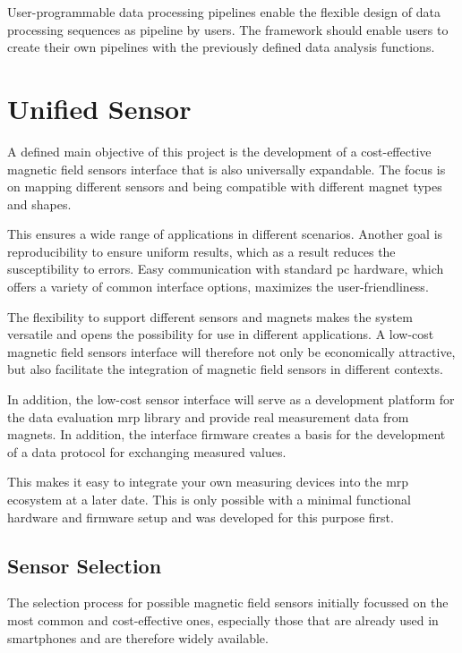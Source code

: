 User-programmable data processing pipelines enable the flexible design
of data processing sequences as pipeline by users. The framework should
enable users to create their own pipelines with the previously defined
data analysis functions.

\hypertarget{unified-sensor}{%
\chapter{Unified Sensor}\label{unified-sensor}}

A defined main objective of this project is the development of a
cost-effective magnetic field sensors interface that is also universally
expandable. The focus is on mapping different sensors and being
compatible with different magnet types and shapes.

This ensures a wide range of applications in different scenarios.
Another goal is reproducibility to ensure uniform results, which as a
result reduces the susceptibility to errors. Easy communication with
standard \gls{pc} hardware, which offers a variety of common interface
options, maximizes the user-friendliness.

The flexibility to support different sensors and magnets makes the
system versatile and opens the possibility for use in different
applications. A low-cost magnetic field sensors interface will therefore
not only be economically attractive, but also facilitate the integration
of magnetic field sensors in different contexts.

In addition, the low-cost sensor interface will serve as a development
platform for the data evaluation \gls{mrp} library and provide real
measurement data from magnets. In addition, the interface firmware
creates a basis for the development of a data protocol for exchanging
measured values.

This makes it easy to integrate your own measuring devices into the
\gls{mrp} ecosystem at a later date. This is only possible with a
minimal functional hardware and firmware setup and was developed for
this purpose first.

\hypertarget{sensor-selection}{%
\section{Sensor Selection}\label{sensor-selection}}

The selection process for possible magnetic field sensors initially
focussed on the most common and cost-effective ones, especially those
that are already used in smartphones and are therefore widely available.

